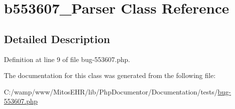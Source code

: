 \hypertarget{classb553607___parser}{\section{b553607\-\_\-\-Parser \-Class \-Reference}
\label{classb553607___parser}
}


\subsection{\-Detailed \-Description}


\-Definition at line 9 of file bug-\/553607.\-php.



\-The documentation for this class was generated from the following file\-:\begin{DoxyCompactItemize}
\item 
\-C\-:/wamp/www/\-Mitos\-E\-H\-R/lib/\-Php\-Documentor/\-Documentation/tests/\hyperlink{bug-553607_8php}{bug-\/553607.\-php}\end{DoxyCompactItemize}
